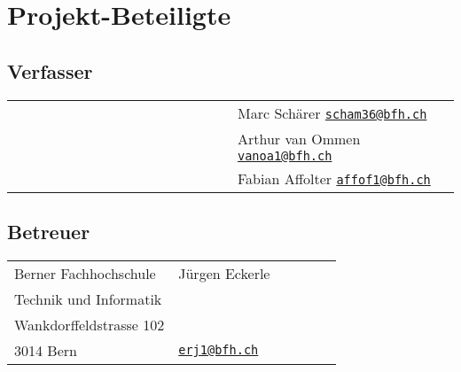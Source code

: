 \section{Projekt-Beteiligte}
%
\subsection*{Verfasser}

\begin{tabular}{p{0.5\linewidth}p{0.5\linewidth}}
  & Marc Schärer \href{mailto:scham36@bfh.ch}{\nolinkurl{scham36@bfh.ch}} \\
  & Arthur van Ommen \href{mailto:vanoa1@bfh.ch}{\nolinkurl{vanoa1@bfh.ch}}\\
  & Fabian Affolter \href{mailto:affof11@bfh.ch}{\nolinkurl{affof1@bfh.ch}}\\
\end{tabular}

%
\subsection*{Betreuer}
\begin{tabular}{p{0.5\linewidth}p{0.5\linewidth}}
Berner Fachhochschule &  Jürgen Eckerle \\
Technik und Informatik &  \\
Wankdorffeldstrasse 102 & \\
3014 Bern & \href{mailto:erj1@bfh.ch}{\nolinkurl{erj1@bfh.ch}} \\
\end{tabular}
%

